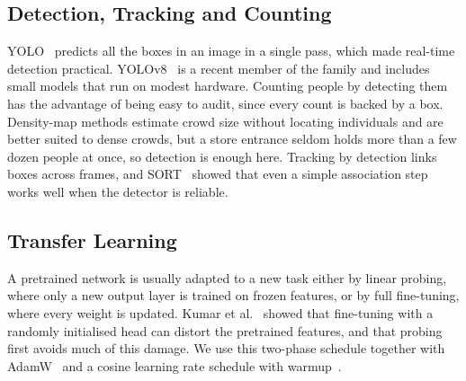 \documentclass[conference]{IEEEtran}
\begin{document}
\subsection{Detection, Tracking and Counting}
YOLO~\cite{redmon2016yolo} predicts all the boxes in an image in a single pass,
which made real-time detection practical. YOLOv8~\cite{jocher2023yolov8} is a
recent member of the family and includes small models that run on modest hardware.
Counting people by detecting them has the advantage of being easy to audit, since
every count is backed by a box. Density-map methods estimate crowd size without
locating individuals and are better suited to dense crowds, but a store entrance
seldom holds more than a few dozen people at once, so detection is enough here.
Tracking by detection links boxes across frames, and SORT~\cite{bewley2016sort}
showed that even a simple association step works well when the detector is
reliable.

\subsection{Transfer Learning}
A pretrained network is usually adapted to a new task either by linear probing,
where only a new output layer is trained on frozen features, or by full
fine-tuning, where every weight is updated. Kumar et
al.~\cite{kumar2022finetuning} showed that fine-tuning with a randomly initialised
head can distort the pretrained features, and that probing first avoids much of
this damage. We use this two-phase schedule together with
AdamW~\cite{loshchilov2019adamw} and a cosine learning rate schedule with
warmup~\cite{loshchilov2017sgdr}.
\end{document}
